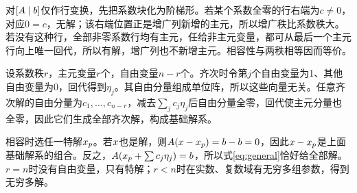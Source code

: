 \label{der:4-2}
对$[A\mid b]$仅作行变换，先把系数块化为阶梯形。若某个系数全零的行右端为$c\ne0$，对应$0=c$，无解；该右端位置正是增广列新增的主元，所以增广秩比系数秩大。若没有这种行，全部非零系数行均有主元，任给非主元变量，都可从最后一个主元行向上唯一回代，所以有解，增广列也不新增主元。相容性与两秩相等因而等价。

设系数秩$r$，主元变量$r$个，自由变量$n-r$个。齐次时令第$j$个自由变量为1、其他自由变量为0，回代得到$\eta_j$。其自由分量组成单位阵，所以这些向量无关。任意齐次解的自由分量为$c_1,\ldots,c_{n-r}$，减去$\sum_jc_j\eta_j$后自由分量全零，回代使主元分量也全零，因此它们生成全部齐次解，构成基础解系。

相容时选任一特解$x_p$。若$x$也是解，则$A(x-x_p)=b-b=0$，因此$x-x_p$是上面基础解系的组合。反之，$A(x_p+\sum c_j\eta_j)=b$，所以式\eqref{eq:general}恰好给全部解。$r=n$时没有自由变量，只有特解；$r<n$时在实数、复数域有无穷多组参数，得到无穷多解。
